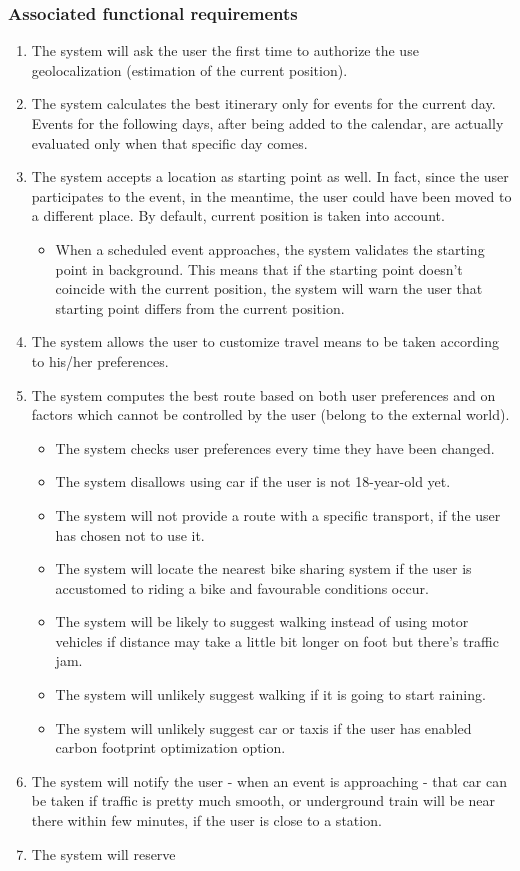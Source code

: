 \subsubsection{Associated functional requirements}
\begin{enumerate}
\item The system will ask the user the first time to authorize the use geolocalization (estimation of the current position).
\item The system calculates the best itinerary only for events for the current day. Events for the following days, after being added to the calendar, are actually evaluated only when that specific day comes.
\item The system accepts a location as starting point as well. In fact, since the user participates to the event, in the meantime, the user could have been moved to a different place. By default, current position is taken into account.
\begin{itemize}
\item When a scheduled event approaches, the system validates the starting point in background. This means that if the starting point doesn't coincide with the current position, the system will warn the user that starting point differs from the current position.
\end{itemize}
\item The system allows the user to customize travel means to be taken according to his/her preferences.
\item The system computes the best route based on both user preferences and on factors which cannot be controlled by the user (belong to the external world).
\begin{itemize}
\item The system checks user preferences every time they have been changed.
\item The system disallows using car if the user is not 18-year-old yet.
\item The system will not provide a route with a specific transport, if the user has chosen not to use it.
\item The system will locate the nearest bike sharing system if the user is accustomed to riding a bike and favourable conditions occur.
\item The system will be likely to suggest walking instead of using motor vehicles if distance may take a little bit longer on foot but there's traffic jam.
\item The system will unlikely suggest walking if it is going to start raining.
\item The system will unlikely suggest car or taxis if the user has enabled carbon footprint optimization option.
\end{itemize}
\item The system will notify the user - when an event is approaching - that car can be taken if traffic is pretty much smooth, or underground train will be near there within few minutes, if the user is close to a station.
\item The system will reserve 
\end{enumerate}

